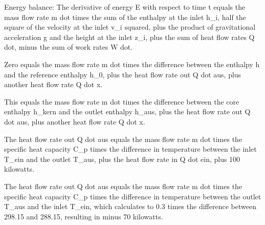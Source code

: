 Energy balance:
The derivative of energy E with respect to time t equals the mass flow rate m dot times the sum of the enthalpy at the inlet h_i, half the square of the velocity at the inlet v_i squared, plus the product of gravitational acceleration g and the height at the inlet z_i, plus the sum of heat flow rates Q dot, minus the sum of work rates W dot.

Zero equals the mass flow rate m dot times the difference between the enthalpy h and the reference enthalpy h_0, plus the heat flow rate out Q dot aus, plus another heat flow rate Q dot x.

This equals the mass flow rate m dot times the difference between the core enthalpy h_kern and the outlet enthalpy h_aus, plus the heat flow rate out Q dot aus, plus another heat flow rate Q dot x.

The heat flow rate out Q dot aus equals the mass flow rate m dot times the specific heat capacity C_p times the difference in temperature between the inlet T_ein and the outlet T_aus, plus the heat flow rate in Q dot ein, plus 100 kilowatts.

The heat flow rate out Q dot aus equals the mass flow rate m dot times the specific heat capacity C_p times the difference in temperature between the outlet T_aus and the inlet T_ein, which calculates to 0.3 times the difference between 298.15 and 288.15, resulting in minus 70 kilowatts.